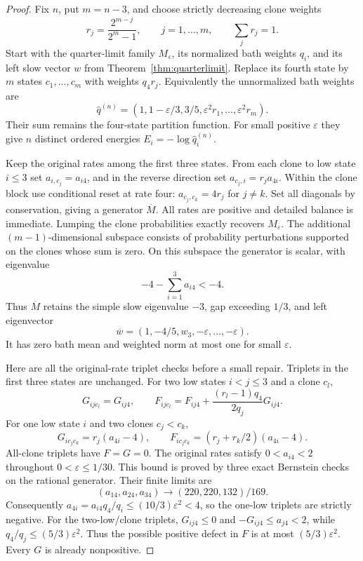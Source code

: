 \documentclass[11pt]{article}
\begin{document}
\begin{proof}
Fix $n$, put $m=n-3$, and choose strictly decreasing clone weights
\[
r_j=\frac{2^{m-j}}{2^m-1},\qquad j=1,\ldots,m,\qquad \sum_jr_j=1.
\]
Start with the quarter-limit family $M_\varepsilon$, its normalized bath
weights $q_i$, and its left slow vector $w$ from
Theorem~\ref{thm:quarterlimit}. Replace its fourth state by $m$ states
$c_1,\ldots,c_m$ with weights $q_4r_j$. Equivalently the unnormalized
bath weights are
\[
\widehat q^{(n)}=(1,1-\varepsilon/3,3/5,
                  \varepsilon^2r_1,\ldots,\varepsilon^2r_m).
\]
Their sum remains the four-state partition function. For small positive
$\varepsilon$ they give $n$ distinct ordered energies
$E_i=-\log\widehat q_i^{(n)}$.

Keep the original rates among the first three states. From each clone to
low state $i\leq3$ set $a_{i,c_j}=a_{i4}$, and in the reverse direction
set $a_{c_j,i}=r_j a_{4i}$. Within the clone block use conditional reset
at rate four: $a_{c_j,c_k}=4r_j$ for $j\ne k$.
Set all diagonals by conservation, giving a generator $\overline M$.
All rates are positive and detailed balance is immediate.
Lumping the clone probabilities exactly recovers $M_\varepsilon$.
The additional $(m-1)$-dimensional subspace consists of probability
perturbations supported on the clones whose sum is zero. On this
subspace the generator is scalar, with eigenvalue
\[
-4-\sum_{i=1}^3a_{i4}<-4.
\]
Thus $\overline M$ retains the simple slow eigenvalue $-3$, gap exceeding
$1/3$, and left eigenvector
\[
\overline w=(1,-4/5,w_3,-\varepsilon,\ldots,-\varepsilon).
\]
It has zero bath mean and weighted norm at most one for small
$\varepsilon$.

Here are all the original-rate triplet checks before a small repair.
Triplets in the first three states are unchanged. For two low states
$i<j\leq3$ and a clone $c_l$,
\[
G_{ijc_l}=G_{ij4},\qquad
F_{ijc_l}=F_{ij4}+
 \frac{(r_l-1)q_4}{2q_j}G_{ij4}.
\]
For one low state $i$ and two clones $c_j<c_k$,
\[
G_{ic_jc_k}=r_j(a_{4i}-4),\qquad
F_{ic_jc_k}=(r_j+r_k/2)(a_{4i}-4).
\]
All-clone triplets have $F=G=0$.
The original rates satisfy $0<a_{i4}<2$ throughout
$0<\varepsilon\leq1/30$. This bound is proved by three exact Bernstein
checks on the rational generator. Their finite limits are
\[
(a_{14},a_{24},a_{34})\longrightarrow(220,220,132)/169.
\]
Consequently $a_{4i}=a_{i4}q_4/q_i\leq(10/3)\varepsilon^2<4$,
so the one-low triplets are strictly negative. For the two-low/clone
triplets, $G_{ij4}\leq0$ and $-G_{ij4}\leq a_{j4}<2$, while
$q_4/q_j\leq(5/3)\varepsilon^2$. Thus the possible positive defect in
$F$ is at most $(5/3)\varepsilon^2$. Every $G$ is already nonpositive.


\end{proof}
\end{document}
